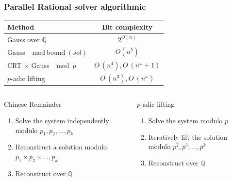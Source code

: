 \documentclass{beamer}
\newcommand{\Q}{\ensuremath{\mathbb{Q}\xspace}}
\newcommand{\GO}[1]{\ensuremath{O(#1)}\xspace}
\newcommand{\SO}[1]{\ensuremath{O\tilde\ (#1)}\xspace}
\begin{document}
\begin{frame}
  \frametitle{Parallel Rational solver algorithmic}
  \begin{center}
    \begin{tabular}{lc}
  \toprule
  Method  & Bit complexity \\
  \midrule
  Gauss over $\mathbb{Q}$ & $2^{\GO{n}}$ \\
  Gauss $\mod \text{bound}(sol)$ & $\GO{n^5}$\\
  CRT $\times$ Gauss $\mod p$ & $\SO{n^4}, \SO{n^\omega+1}$\\
  $p$-adic lifting & $\SO{n^3}, \SO{n^\omega}$\\
  \bottomrule
\end{tabular}
  \end{center}

  \begin{columns}
    \begin{column}{.48\textwidth}
      \begin{block}  {Chinese Remainder}
        \begin{enumerate}
        \item Solve the system independently modulo $p_1,p_2,\dots,p_k$
        \item Reconstruct a solution modulo $p_1\times p_2\times \dots,p_k$.
        \item Reconstruct over $\Q$
        \end{enumerate}
      \end{block}
    \end{column}
    \begin{column}{.48\textwidth}
      \begin{block} {$p$-adic lifting}
        \begin{enumerate}
        \item Solve the system modulo $p$
        \item Iteratively lift the solution modulo $p^2,p^3,\dots,p^k$
        \item Reconstruct over $\Q$
        \end{enumerate}
      \end{block}
    \end{column}
  \end{columns}
\end{frame}

\end{document}
